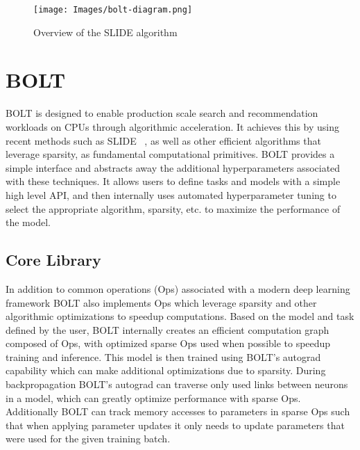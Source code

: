 \documentclass[sigconf]{acmart}
\begin{document}
\begin{figure}
    \centering
    \texttt{[image: Images/bolt-diagram.png]}
    \caption{Overview of the SLIDE algorithm}
    \label{fig:slide}
    \vspace{-0.5cm}
\end{figure}

\section{BOLT}

BOLT is designed to enable production scale search and recommendation workloads on CPUs through algorithmic acceleration. It achieves this by using recent methods such as SLIDE ~\cite{chen2020slide}, as well as other efficient algorithms that leverage sparsity, as fundamental computational primitives. BOLT provides a simple interface and abstracts away the additional hyperparameters associated with these techniques. It allows users to define tasks and models with a simple high level API, and then internally uses automated hyperparameter tuning to select the appropriate algorithm, sparsity, etc. to maximize the performance of the model. 



\subsection{Core Library}

In addition to common operations (Ops) associated with a modern deep learning framework BOLT also implements Ops which leverage sparsity and other algorithmic optimizations to speedup computations. Based on the model and task defined by the user, BOLT internally creates an efficient computation graph composed of Ops, with optimized sparse Ops used when possible to speedup training and inference. This model is then trained using BOLT's autograd capability which can make additional optimizations due to sparsity. During backpropagation BOLT's autograd can traverse only used links between neurons in a model, which can greatly optimize performance with sparse Ops. Additionally BOLT can track memory accesses to parameters in sparse Ops such that when applying parameter updates it only needs to update parameters that were used for the given training batch. 
\end{document}
